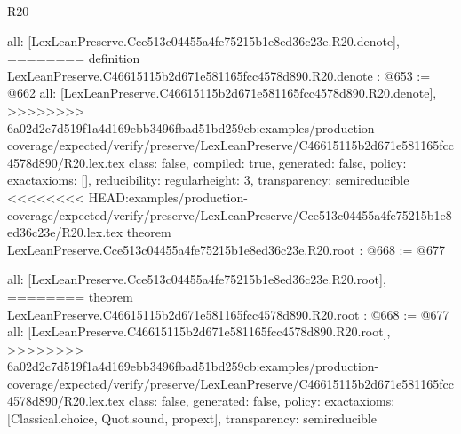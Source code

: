 \begin{lexlean}{R20}
\begin{coremodule}
{{{{{{{{{{  all: [LexLeanPreserve.Cce513c04455a4fe75215b1e8ed36c23e.R20.denote],
========
definition LexLeanPreserve.C46615115b2d671e581165fcc4578d890.R20.denote : @653 := @662 {
  all: [LexLeanPreserve.C46615115b2d671e581165fcc4578d890.R20.denote],
>>>>>>>> 6a02d2c7d519f1a4d169ebb3496fbad51bd259cb:examples/production-coverage/expected/verify/preserve/LexLeanPreserve/C46615115b2d671e581165fcc4578d890/R20.lex.tex
  class: false,
  compiled: true,
  generated: false,
  policy: exact{axioms: []},
  reducibility: regular{height: 3},
  transparency: semireducible
}
<<<<<<<< HEAD:examples/production-coverage/expected/verify/preserve/LexLeanPreserve/Cce513c04455a4fe75215b1e8ed36c23e/R20.lex.tex
theorem LexLeanPreserve.Cce513c04455a4fe75215b1e8ed36c23e.R20.root : @668 := @677 {
  all: [LexLeanPreserve.Cce513c04455a4fe75215b1e8ed36c23e.R20.root],
========
theorem LexLeanPreserve.C46615115b2d671e581165fcc4578d890.R20.root : @668 := @677 {
  all: [LexLeanPreserve.C46615115b2d671e581165fcc4578d890.R20.root],
>>>>>>>> 6a02d2c7d519f1a4d169ebb3496fbad51bd259cb:examples/production-coverage/expected/verify/preserve/LexLeanPreserve/C46615115b2d671e581165fcc4578d890/R20.lex.tex
  class: false,
  generated: false,
  policy: exact{axioms: [Classical.choice, Quot.sound, propext]},
  transparency: semireducible
}

}}}}}}}}}}}
\end{coremodule}
\end{lexlean}
